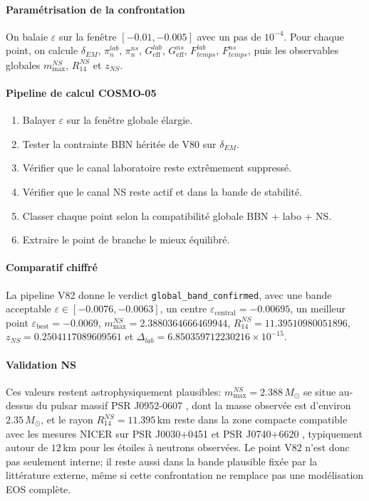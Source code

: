 \documentclass[11pt,a4paper]{article}
\begin{document}
\paragraph{Paramétrisation de la confrontation}
On balaie $\varepsilon$ sur la fenêtre $[-0.01,-0.005]$ avec un pas de $10^{-4}$. Pour chaque point, on calcule $\delta_{EM}$, $\pi_n^{lab}$, $\pi_n^{ns}$, $G_{\mathrm{eff}}^{lab}$, $G_{\mathrm{eff}}^{ns}$, $F_{temps}^{lab}$, $F_{temps}^{ns}$, puis les observables globales $m_{\max}^{NS}$, $R_{14}^{NS}$ et $z_{NS}$.

\paragraph{Pipeline de calcul COSMO-05}
\begin{enumerate}[leftmargin=*,itemsep=0.2em,topsep=0.2em]
\item Balayer $\varepsilon$ sur la fenêtre globale élargie.
\item Tester la contrainte BBN héritée de V80 sur $\delta_{EM}$.
\item Vérifier que le canal laboratoire reste extrêmement suppressé.
\item Vérifier que le canal NS reste actif et dans la bande de stabilité.
\item Classer chaque point selon la compatibilité globale BBN + labo + NS.
\item Extraire le point de branche le mieux équilibré.
\end{enumerate}

\paragraph{Comparatif chiffré}
La pipeline V82 donne le verdict \texttt{global\_band\_confirmed}, avec une bande acceptable $\varepsilon\in[-0.0076,-0.0063]$, un centre $\varepsilon_{\mathrm{central}}=-0.00695$, un meilleur point $\varepsilon_{\mathrm{best}}=-0.0069$, $m_{\max}^{NS}=2.3880364666469944$, $R_{14}^{NS}=11.39510980051896$, $z_{NS}=0.2504117089609561$ et $\Delta_{lab}=6.850359712230216\times 10^{-15}$.

\paragraph{Validation NS}
Ces valeurs restent astrophysiquement plausibles: $m_{\max}^{NS}=2.388\,M_\odot$ se situe au-dessus du pulsar massif PSR J0952-0607 \cite{j0952}, dont la masse observée est d'environ $2.35\,M_\odot$, et le rayon $R_{14}^{NS}=11.395\,\mathrm{km}$ reste dans la zone compacte compatible avec les mesures NICER sur PSR J0030+0451 et PSR J0740+6620 \cite{nicer0030,nicer0740}, typiquement autour de $12\,\mathrm{km}$ pour les étoiles à neutrons observées. Le point V82 n'est donc pas seulement interne; il reste aussi dans la bande plausible fixée par la littérature externe, même si cette confrontation ne remplace pas une modélisation EOS complète.
\end{document}
